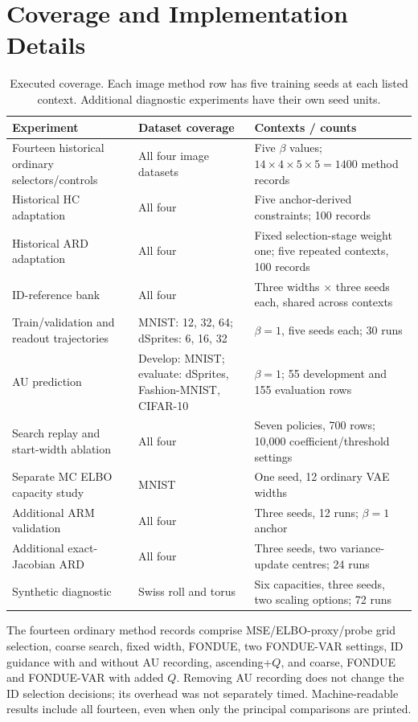 \documentclass[make,article,submit,pdftex,moreauthors]{Definitions/mdpi}
\begin{document}
\section{Coverage and Implementation Details}\label{app:coverage}
\begin{table}[H]
\caption{Executed coverage. Each image method row has five training
seeds at each listed context. Additional diagnostic experiments have
their own seed units.}
\label{tab:coverage}\small
\begin{tabularx}{\textwidth}{>{\raggedright\arraybackslash}p{}>{\raggedright\arraybackslash}p{}>{\raggedright\arraybackslash}X}\toprule
Experiment & Dataset coverage & Contexts / counts \\\midrule
Fourteen historical ordinary selectors/controls & All four image datasets & Five $\beta$ values; $14\times4\times5\times5=1400$ method records \\
Historical HC adaptation & All four & Five anchor-derived constraints; 100 records \\
Historical ARD adaptation & All four & Fixed selection-stage weight one; five repeated contexts, 100 records \\
ID-reference bank & All four & Three widths $\times$ three seeds each, shared across contexts \\
Train/validation and readout trajectories & MNIST: 12, 32, 64; dSprites: 6, 16, 32 & $\beta=1$, five seeds each; 30 runs \\
AU prediction & Develop: MNIST; evaluate: dSprites, Fashion-MNIST, CIFAR-10 & $\beta=1$; 55 development and 155 evaluation rows \\
Search replay and start-width ablation & All four & Seven policies, 700 rows; 10,000 coefficient/threshold settings \\
Separate MC ELBO capacity study & MNIST & One seed, 12 ordinary VAE widths \\
Additional ARM validation & All four & Three seeds, 12 runs; $\beta=1$ anchor \\
Additional exact-Jacobian ARD & All four & Three seeds, two variance-update centres; 24 runs \\
Synthetic diagnostic & Swiss roll and torus & Six capacities, three seeds, two scaling options; 72 runs \\
\bottomrule\end{tabularx}
\end{table}

The fourteen ordinary method records comprise MSE/ELBO-proxy/probe grid
selection, coarse search, fixed width, FONDUE, two FONDUE-VAR settings,
ID guidance with and without AU recording, ascending+$Q$, and coarse,
FONDUE and FONDUE-VAR with added $Q$. Removing AU recording does not
change the ID selection decisions; its overhead was not separately
timed. Machine-readable results include all fourteen, even when only
the principal comparisons are printed.
\end{document}
